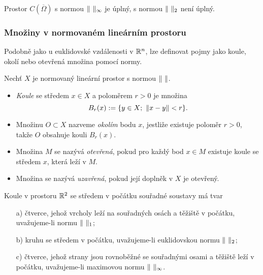 \begin{veta}
Prostor $C(\overline\Omega)$ s normou $\norm{\ }_\infty$ je úplný, s normou $\norm{\ }_2$ není úplný.
\end{veta}



\subsubsection{Množiny v normovaném lineárním prostoru}
% 
Podobně jako u euklidovské vzdálenosti v $\mathbb R^n$, lze definovat pojmy jako koule, okolí nebo otevřená množina pomocí normy.
\begin{df}
Nechť $X$ je normovaný lineární prostor s normou $\|\ \|$.
\begin{itemize}
\item \emph{Koule} se středem $x\in X$ a poloměrem $r>0$ je množina
\[ B_r(x) := \{y\in X;~\|x-y\|<r\}. \]
\item Množinu $O\subset X$ nazveme \emph{okolím} bodu $x$, jestliže existuje poloměr $r>0$, takže $O$ obsahuje kouli $B_r(x)$.
\item Množina $M$ se nazývá \emph{otevřená}, pokud pro každý bod $x\in M$ existuje koule se středem $x$, která leží v $M$.
\item Množina se nazývá \emph{uzavřená}, pokud její doplněk v $X$ je otevřený.
\end{itemize}
\end{df}

\begin{ex}
Koule v prostoru $\mathbb R^2$ se středem v počátku souřadné soustavy má tvar
\begin{itemize}
\item[a)] čtverce, jehož vrcholy leží na souřadných osách a těžiště v počátku, uvažujeme-li normu $\|\ \|_1$;
\item[b)] kruhu se středem v počátku, uvažujeme-li euklidovskou normu $\norm{\ }_2$;
\item[c)] čtverce, jehož strany jsou rovnoběžné se souřadnými osami a těžiště leží v počátku, uvažujeme-li maximovou normu $\norm{\ }_\infty$.
\end{itemize}
\end{ex}

